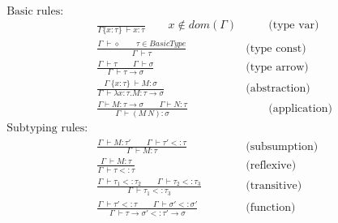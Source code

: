 \begin{align}
  \text{Basic rules:}      & \nonumber \\
  & \frac{}
         {\Gamma\{x:\tau\} ~ \vdash x:\tau} \qquad x \not \in dom(\Gamma) & \qquad \text{(type var)}\\
  & \frac{\Gamma~ \vdash \diamond \qquad \tau \in BasicType}
         {\Gamma~ \vdash \tau}    & \text{(type const)}  \\
  & \frac{\Gamma~ \vdash \tau \qquad \Gamma~ \vdash \sigma}
         {\Gamma~ \vdash \tau \rightarrow \sigma}  & \text{(type arrow)}  \\
  & \frac{\Gamma~ \{x:\tau\} ~ \vdash M:\sigma}
         {\Gamma ~ \vdash \lambda x:\tau.M:\tau \rightarrow \sigma} & \text{(abstraction)} \\
  & \frac{\Gamma \vdash M:\tau \rightarrow \sigma \qquad  \Gamma \vdash N:\tau}
         {\Gamma ~ \vdash (M~N):\sigma} & \qquad \text{(application)} \label{application}\\
\text{Subtyping rules:}   \nonumber\\
  & \frac{\Gamma~ \vdash M : \tau'  \qquad \Gamma~ \vdash \tau' <: \tau}
                                           {\Gamma~ \vdash M : \tau} & \text{(subsumption)}\\
  & \frac{\Gamma~ \vdash M : \tau}
                                    {\Gamma~ \vdash \tau <: \tau} & \text{(reflexive)}\\
  & \frac{\Gamma~ \vdash \tau_1 <: \tau_2 \qquad \Gamma~ \vdash \tau_2 <: \tau_3}
                                     {\Gamma~ \vdash \tau_1 <: \tau_3} & \text{(transitive)} \\
  & \frac{\Gamma ~ \vdash \tau' <: \tau \qquad \Gamma ~ \vdash \sigma' <: \sigma'}
         {\Gamma ~ \vdash \tau \rightarrow \sigma' <: \tau' \rightarrow \sigma} & \text{(function)}  \label{eqn:function_subtyping}
\end{align}

